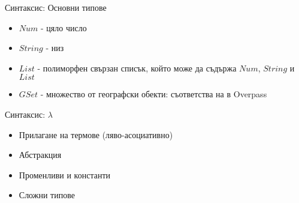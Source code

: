 \documentclass[9pt]{beamer}
\begin{document}
  \begin{frame}{Синтаксис: Основни типове}
    \begin{itemize}
      \item $Num$ - цяло число \pika
      \item $String$ - низ \pika
      \item $List$ - полиморфен свързан списък, който може
        да съдържа $Num$, $String$ и $List$
      \item $GSet$ - множество от географски обекти: съответства на 
        в Overpass
    \end{itemize}
  \end{frame}

  \begin{frame}{Синтаксис: $\lambda$}
    \begin{itemize}
      \item Прилагане на термове (ляво-асоциативно)
        \begin{center}
        \end{center}
      \item Абстракция
        \begin{center}
        \end{center}
      \item Променливи и константи
      \item Сложни типове
        \begin{center}
        \end{center}
    \end{itemize}
  \end{frame}
\end{document}
